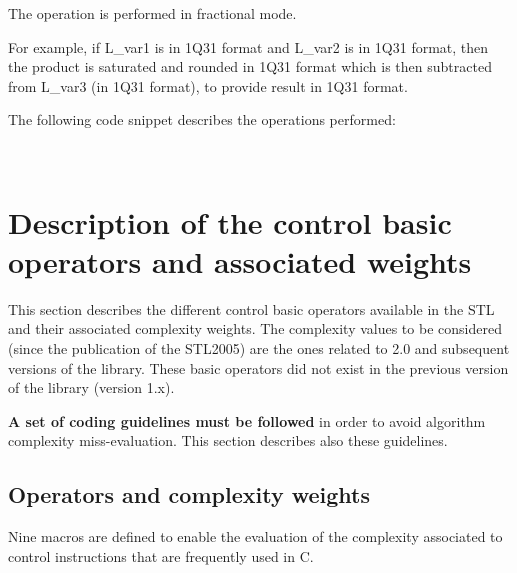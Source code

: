 The operation is performed in fractional mode.

For example, if L\_var1 is in 1Q31 format and L\_var2 is in 1Q31 format, then the product is saturated and rounded in 1Q31 format which is then subtracted from L\_var3 (in 1Q31 format), to provide result in 1Q31 format.

The following code snippet describes the operations performed:

\\



\section{Description of the control basic operators and associated weights}

This section describes the different control basic operators
available in the STL and their associated complexity weights. The
complexity values to be considered (since the publication of the
STL2005) are the ones related to 2.0 and subsequent versions of the library.
These basic operators did not exist in the previous version of the
library (version 1.x).

\textbf{A set of coding guidelines must be followed} in order to
avoid algorithm complexity miss-evaluation. This section describes
also these guidelines.

\subsection{Operators and complexity weights}
Nine macros are defined to enable the evaluation of the complexity
associated to control instructions that are frequently used in C.

